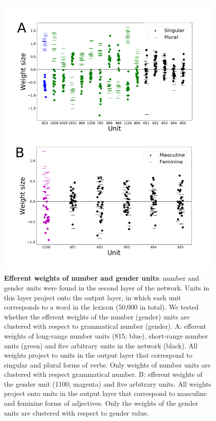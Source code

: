 \begin{figure}
    \centering
    \includegraphics[width=\linewidth]{figures/SM/FigureS2_output_weights.png}
    \caption{\textbf{Efferent weights of number and gender units}: number and gender units were found in the second layer of the network. Units in this layer project onto the output layer, in which each unit corresponds to a word in the lexicon (50,000 in total). We tested whether the efferent weights of the number (gender) units are clustered with respect to grammatical number (gender). A: efferent weights of long-range number units (815; blue), short-range number units (green) and five arbitrary units in the network (black). All weights project to units in the output layer that correspond to singular and plural forms of verbs. Only weights of number units are clustered with respect grammatical number. B: efferent weights of the gender unit (1100; magenta) and five arbitrary units. All weights project onto units in the output layer that correspond to masculine and feminine forms of adjectives. Only the weights of the gender units are clustered with respect to gender value.}
    \label{fig:efferent_weights}
\end{figure}

